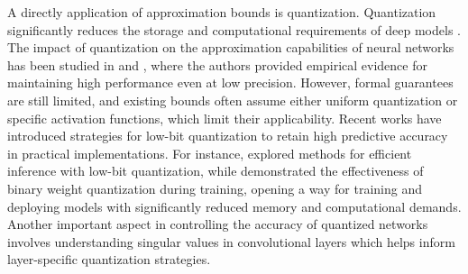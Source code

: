 	
	
	
	A directly  application of approximation bounds is quantization.  Quantization significantly reduces the storage and computational requirements of deep models \cite{gholami2022survey}. The impact of quantization on the approximation capabilities of neural networks has been studied in \cite{ding2019universal} and \cite{hubara2018quantized}, where the authors provided empirical evidence for maintaining high performance even at low precision. However, formal guarantees are still limited, and existing bounds often assume either uniform quantization or specific activation functions, which limit their applicability. Recent works have introduced strategies for low-bit quantization to retain high predictive accuracy in practical implementations. For instance, \cite{choukroun2019low} explored methods for efficient inference with low-bit quantization, while \cite{courbariaux2015binaryconnect} demonstrated the effectiveness of binary weight quantization during training, opening a way for training and deploying models with significantly reduced memory and computational demands. Another important aspect in controlling the accuracy of quantized networks involves understanding singular values in convolutional layers  \cite{sedghi2018singular} which helps inform layer-specific quantization strategies.